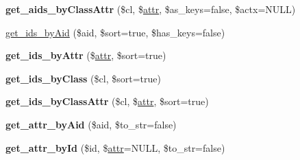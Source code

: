 \begin{DoxyCompactItemize}
{\bfseries get\+\_\+aids\+\_\+by\+Class\+Attr} (\$cl, \$\mbox{\hyperlink{classduzun_1_1hQuery_1_1Node_a530ab9e8edeb1e876b369dcb321208c0}{attr}}, \$as\+\_\+keys=false, \$actx=N\+U\+LL)
\item 
\mbox{\hyperlink{classduzun_1_1hQuery_1_1HTML__Parser_aa52f76edd98bf62306b955d7b56bbd6d}{get\+\_\+ids\+\_\+by\+Aid}} (\$aid, \$sort=true, \$has\+\_\+keys=false)
\item 
\mbox{\label{classduzun_1_1hQuery_1_1HTML__Parser_a0b9fb11d65dbb37c1d177cfebf94482b}} 
{\bfseries get\+\_\+ids\+\_\+by\+Attr} (\$\mbox{\hyperlink{classduzun_1_1hQuery_1_1Node_a530ab9e8edeb1e876b369dcb321208c0}{attr}}, \$sort=true)
\item 
\mbox{\label{classduzun_1_1hQuery_1_1HTML__Parser_ab4169e8be484a407c4513c7c8522c178}} 
{\bfseries get\+\_\+ids\+\_\+by\+Class} (\$cl, \$sort=true)
\item 
\mbox{\label{classduzun_1_1hQuery_1_1HTML__Parser_a75208660815f0ed326d35a573c392342}} 
{\bfseries get\+\_\+ids\+\_\+by\+Class\+Attr} (\$cl, \$\mbox{\hyperlink{classduzun_1_1hQuery_1_1Node_a530ab9e8edeb1e876b369dcb321208c0}{attr}}, \$sort=true)
\item 
\mbox{\label{classduzun_1_1hQuery_1_1HTML__Parser_a58399bccda24724da44503d4ee893037}} 
{\bfseries get\+\_\+attr\+\_\+by\+Aid} (\$aid, \$to\+\_\+str=false)
\item 
\mbox{\label{classduzun_1_1hQuery_1_1HTML__Parser_a831ff3d15436fd6a205b690711bc0fbe}} 
{\bfseries get\+\_\+attr\+\_\+by\+Id} (\$id, \$\mbox{\hyperlink{classduzun_1_1hQuery_1_1Node_a530ab9e8edeb1e876b369dcb321208c0}{attr}}=N\+U\+LL, \$to\+\_\+str=false)
\end{DoxyCompactItemize}
